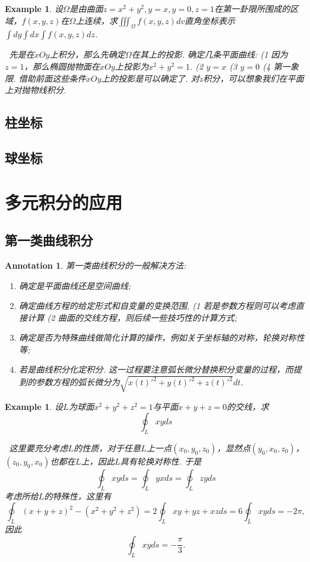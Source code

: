 \documentclass{article}
\newtheorem{example}[theorem]{Example}
\newtheorem{annotation}[theorem]{Annotation}
\newcommand{\hints}{{\color{blue} \text{hints}}}
\begin{document}
\begin{example}
\rm 设$\Omega$是由曲面$z = x^2+y^2, y=x, y=0, z=1$在第一卦限所围成的区域，$f(x,y,z)$在$\Omega$上连续，求$\iiint_\Omega f(x,y,z)dv$直角坐标表示$\int dy \int dx \int f(x,y,z)dz$. 

\hints\ 先是在$xOy$上积分，那么先确定$\Omega$在其上的投影. 确定几条平面曲线: (1 因为$z=1$，那么椭圆抛物面在$xOy$上投影为$x^2+y^2 = 1$. (2 $y=x$ (3 $y=0$ (4 第一象限. 借助前面这些条件$xOy$上的投影是可以确定了. 对$z$积分，可以想象我们在平面上对抛物线积分. 
\end{example}

\subsection{柱坐标}

\subsection{球坐标}


\newpage
\section{多元积分的应用}

\subsection{第一类曲线积分}

\begin{annotation}
\rm 第一类曲线积分的一般解决方法:
\begin{enumerate}
	\item 确定是平面曲线还是空间曲线;
	\item 确定曲线方程的给定形式和自变量的变换范围, (1 若是参数方程则可以考虑直接计算 (2 曲面的交线方程，则后续一些技巧性的计算方式;
	\item 确定是否为特殊曲线做简化计算的操作，例如关于坐标轴的对称，轮换对称性等;
	\item 若是曲线积分化定积分. 这一过程要注意弧长微分替换积分变量的过程，而提到的参数方程的弧长微分为$\sqrt{x(t)'^2 + y(t)'^2 + z(t)'^2}dt$.  
\end{enumerate}
\end{annotation}

\begin{example}
\rm 设$L$为球面$x^2+y^2+z^2=1$与平面$x+y+z=0$的交线，求
$$
\oint_L xyds
$$

\hints\ 这里要充分考虑$L$的性质，对于任意$L$上一点$(x_0,y_0,z_0)$，显然点$(y_0,x_0,z_0)$，$(z_0,y_0,x_0)$也都在$L$上，因此$L$具有轮换对称性. 于是
$$
\oint_L xyds = \oint_L yx ds = \oint_L zyds 
$$
考虑所给$L$的特殊性，这里有
$$
\oint_L (x+y+z)^2 - (x^2+y^2+z^2) = 2 \oint_L xy+yz+xz ds = 6 \oint_L xyds = -2\pi, 
$$
因此
$$
\oint_L xyds = -\frac{\pi}{3}. 
$$
\end{example}
\end{document}
